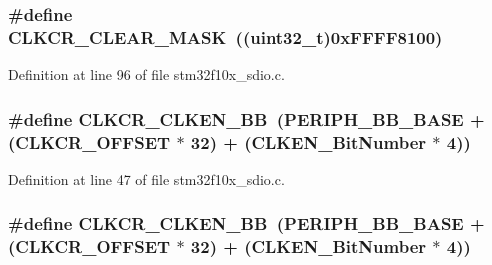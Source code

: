 \subsubsection[{\texorpdfstring{C\+L\+K\+C\+R\+\_\+\+C\+L\+E\+A\+R\+\_\+\+M\+A\+SK}{CLKCR_CLEAR_MASK}}]{\setlength{\rightskip}{0pt plus 5cm}\#define C\+L\+K\+C\+R\+\_\+\+C\+L\+E\+A\+R\+\_\+\+M\+A\+SK~(({\bf uint32\+\_\+t})0x\+F\+F\+F\+F8100)}\hypertarget{group___s_d_i_o___private___types_definitions_gac8d10dd1e49ca9e8a6954146654e9a01}{}\label{group___s_d_i_o___private___types_definitions_gac8d10dd1e49ca9e8a6954146654e9a01}


Definition at line 96 of file stm32f10x\+\_\+sdio.\+c.

\subsubsection[{\texorpdfstring{C\+L\+K\+C\+R\+\_\+\+C\+L\+K\+E\+N\+\_\+\+BB}{CLKCR_CLKEN_BB}}]{\setlength{\rightskip}{0pt plus 5cm}\#define C\+L\+K\+C\+R\+\_\+\+C\+L\+K\+E\+N\+\_\+\+BB~({\bf P\+E\+R\+I\+P\+H\+\_\+\+B\+B\+\_\+\+B\+A\+SE} + ({\bf C\+L\+K\+C\+R\+\_\+\+O\+F\+F\+S\+ET} $\ast$ 32) + ({\bf C\+L\+K\+E\+N\+\_\+\+Bit\+Number} $\ast$ 4))}\hypertarget{group___s_d_i_o___private___types_definitions_gabfb5772b9b734972b576309f7ca8bf92}{}\label{group___s_d_i_o___private___types_definitions_gabfb5772b9b734972b576309f7ca8bf92}


Definition at line 47 of file stm32f10x\+\_\+sdio.\+c.

\subsubsection[{\texorpdfstring{C\+L\+K\+C\+R\+\_\+\+C\+L\+K\+E\+N\+\_\+\+BB}{CLKCR_CLKEN_BB}}]{\setlength{\rightskip}{0pt plus 5cm}\#define C\+L\+K\+C\+R\+\_\+\+C\+L\+K\+E\+N\+\_\+\+BB~({\bf P\+E\+R\+I\+P\+H\+\_\+\+B\+B\+\_\+\+B\+A\+SE} + ({\bf C\+L\+K\+C\+R\+\_\+\+O\+F\+F\+S\+ET} $\ast$ 32) + ({\bf C\+L\+K\+E\+N\+\_\+\+Bit\+Number} $\ast$ 4))}\hypertarget{group___s_d_i_o___private___types_definitions_gabfb5772b9b734972b576309f7ca8bf92}{}\label{group___s_d_i_o___private___types_definitions_gabfb5772b9b734972b576309f7ca8bf92}


